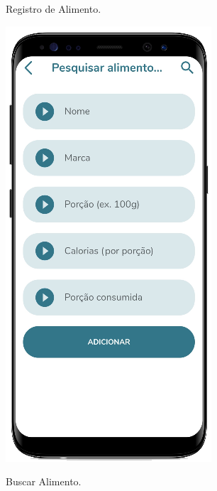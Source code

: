 \begin{figure}[htb]
    \centering
    \begin{minipage}{0.39\textwidth}
        \centering
        \caption{Registro de Alimento.}\label{fig_reg_alimento}
        \includegraphics[scale=0.59]{Imagens/desenvolvimento/app/reg_alimento.png}
    \end{minipage}
    \hfill
    \begin{minipage}{0.58\textwidth}
        \centering
        \caption{Buscar Alimento.}\label{fig_busca_alimento}

\end{minipage}
\end{figure}
